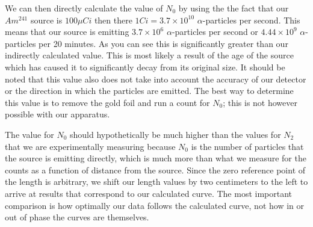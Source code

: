 \indent \indent We can then directly calculate the value of $N_0$ by using the the fact that our $Am^{241}$ source is $100\mu Ci$ then there $1 Ci = 3.7 \times 10^{10}$ $\alpha$-particles per second. This means that our source is emitting $3.7 \times 10^{6}$ $\alpha$-particles per second or $4.44 \times 10^{9}$ $\alpha$-particles per 20 minutes.  As you can see this is significantly greater than our indirectly calculated value.  This is most likely a result of the age of the source which has caused it to significantly decay from its original size. It should be noted that this value also does not take into account the accuracy of our detector or the direction in which the particles are emitted.  The best way to determine this value is to remove the gold foil and run a count for $N_0$; this is not however possible with our apparatus. 

The value for $N_0$ should hypothetically be much higher than the values for $N_2$ that we are experimentally measuring because $N_0$ is the number of particles that the source is emitting directly, which is much more than what we measure for the counts as a function of distance from the source. Since the zero reference point of the length is arbitrary, we shift our length values by two centimeters to the left to arrive at results that correspond to our calculated curve. The most important comparison is how optimally our data follows the calculated curve, not how in or out of phase the curves are themselves. 


